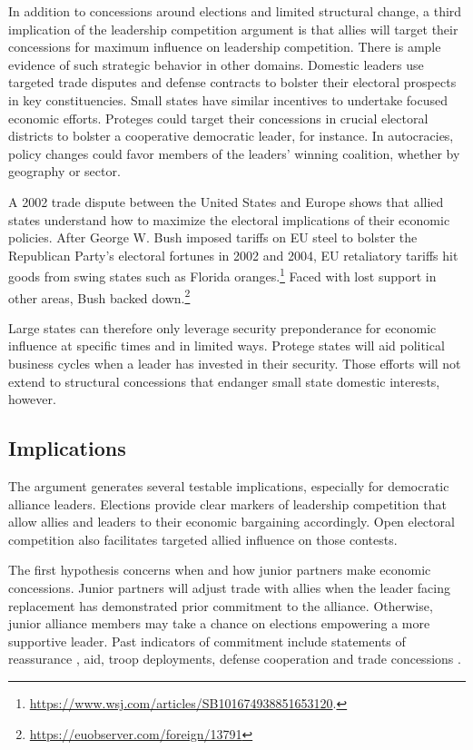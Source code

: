 \documentclass[12pt]{article}
\begin{document}
In addition to concessions around elections and limited structural change, a third implication of the leadership competition argument is that allies will target their concessions for maximum influence on leadership competition. 
There is ample evidence of such strategic behavior in other domains.
Domestic leaders use targeted trade disputes \citep{Conconietal2017} and defense contracts \citep{DerouenHeo2000} to bolster their electoral prospects in key constituencies.  
Small states have similar incentives to undertake focused economic efforts.
Proteges could target their concessions in crucial electoral districts to bolster a cooperative democratic leader, for instance. 
In autocracies, policy changes could favor members of the leaders' winning coalition, whether by geography or sector.


A 2002 trade dispute between the United States and Europe shows that allied states understand how to maximize the electoral implications of their economic policies. 
After George W. Bush imposed tariffs on EU steel to bolster the Republican Party's electoral fortunes in 2002 and 2004, EU retaliatory tariffs hit goods from swing states such as Florida oranges.\footnote{\url{https://www.wsj.com/articles/SB101674938851653120}.}
Faced with lost support in other areas, Bush backed down.\footnote{\url{https://euobserver.com/foreign/13791}}


Large states can therefore only leverage security preponderance for economic influence at specific times and in limited ways.
Protege states will aid political business cycles when a leader has invested in their security. 
Those efforts will not extend to structural concessions that endanger small state domestic interests, however.



\subsection{Implications}



The argument generates several testable implications, especially for democratic alliance leaders.
Elections provide clear markers of leadership competition that allow allies and leaders to their economic bargaining accordingly. 
Open electoral competition also facilitates targeted allied influence on those contests. 


The first hypothesis concerns when and how junior partners make economic concessions. 
Junior partners will adjust trade with allies when the leader facing replacement has demonstrated prior commitment to the alliance. 
Otherwise, junior alliance members may take a chance on elections empowering a more supportive leader. 
Past indicators of commitment include statements of reassurance \citep{Blankenship2020}, aid, troop deployments, defense cooperation \citep{Morrow1994, Alley2021isq} and trade concessions \citep{WolfordKim2017}.
\end{document}
